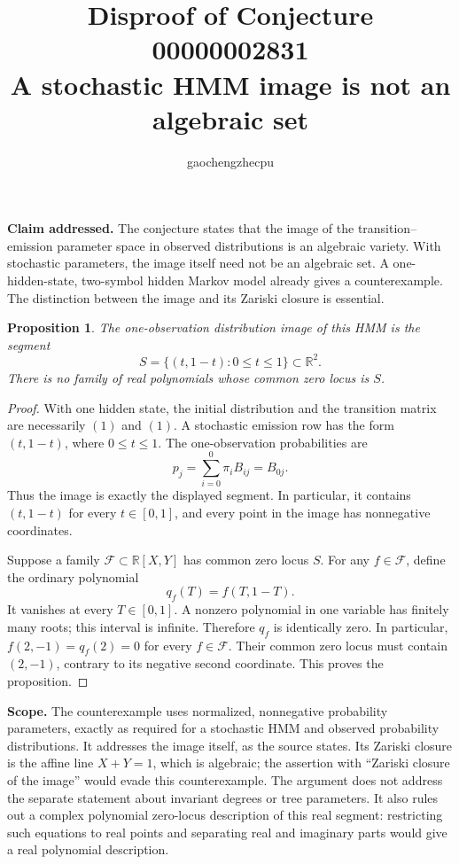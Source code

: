 \documentclass[11pt]{article}
\title{Disproof of Conjecture 00000002831\\A stochastic HMM image is not an algebraic set}
\author{gaochengzhecpu}\date{}
\newtheorem{proposition}{Proposition}
\begin{document}
\maketitle
\noindent\textbf{Claim addressed.} The conjecture states that the image of the transition--emission parameter space in observed distributions is an algebraic variety. With stochastic parameters, the image itself need not be an algebraic set. A one-hidden-state, two-symbol hidden Markov model already gives a counterexample. The distinction between the image and its Zariski closure is essential.

\begin{proposition}
The one-observation distribution image of this HMM is the segment
\[
 S=\{(t,1-t):0\le t\le1\}\subset\mathbb R^2.
\]
There is no family of real polynomials whose common zero locus is $S$.
\end{proposition}
\begin{proof}
With one hidden state, the initial distribution and the transition matrix are necessarily $(1)$ and $(1)$. A stochastic emission row has the form $(t,1-t)$, where $0\le t\le1$. The one-observation probabilities are
\[
 p_j=\sum_{i=0}^{0}\pi_i B_{ij}=B_{0j}.
\]
Thus the image is exactly the displayed segment. In particular, it contains $(t,1-t)$ for every $t\in[0,1]$, and every point in the image has nonnegative coordinates.

Suppose a family $\mathcal F\subset\mathbb R[X,Y]$ has common zero locus $S$. For any $f\in\mathcal F$, define the ordinary polynomial
\[
 q_f(T)=f(T,1-T).
\]
It vanishes at every $T\in[0,1]$. A nonzero polynomial in one variable has finitely many roots; this interval is infinite. Therefore $q_f$ is identically zero. In particular, $f(2,-1)=q_f(2)=0$ for every $f\in\mathcal F$. Their common zero locus must contain $(2,-1)$, contrary to its negative second coordinate. This proves the proposition.
\end{proof}

\noindent\textbf{Scope.} The counterexample uses normalized, nonnegative probability parameters, exactly as required for a stochastic HMM and observed probability distributions. It addresses the image itself, as the source states. Its Zariski closure is the affine line $X+Y=1$, which is algebraic; the assertion with ``Zariski closure of the image'' would evade this counterexample. The argument does not address the separate statement about invariant degrees or tree parameters. It also rules out a complex polynomial zero-locus description of this real segment: restricting such equations to real points and separating real and imaginary parts would give a real polynomial description.
\end{document}
